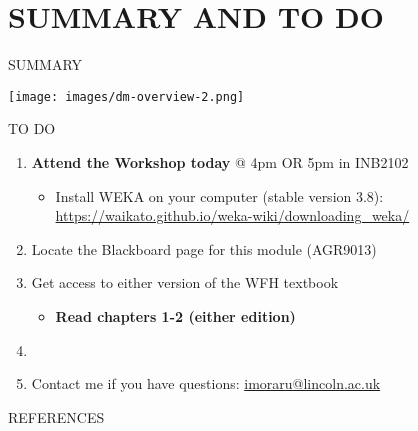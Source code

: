 \documentclass[handout]{beamer}
\newcommand{\strong}[1]{\textbf{\color{teal} #1}}
\begin{document}
\section{SUMMARY AND TO DO}
\begin{frame}{SUMMARY}
\begin{center}
\texttt{[image: images/dm-overview-2.png]}
\end{center}
\end{frame}
\begin{frame}{TO DO}
\begin{enumerate}
\item \strong{Attend the Workshop today} @ 4pm OR 5pm in INB2102
	\begin{itemize}
	\item Install WEKA on your computer (stable version 3.8):\\
	{\small\url{https://waikato.github.io/weka-wiki/downloading_weka/}}
	\end{itemize}
\item Locate the Blackboard page for this module (AGR9013)
\item Get access to either version of the WFH textbook\\
	\begin{itemize}
	\item \strong{Read chapters 1-2 (either edition)}\\
	\end{itemize}
\item[]
\item Contact me if you have questions: \url{imoraru@lincoln.ac.uk}
\end{enumerate}
\end{frame}


\begin{frame}{REFERENCES}


\end{frame}
\end{document}
